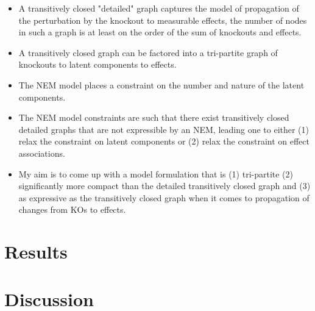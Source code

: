 \documentclass{article}
\begin{document}
\begin{itemize}
 \item A transitively closed "detailed" graph captures the model of propagation of the perturbation by the knockout to measurable effects, the number of nodes in such a graph is at least on the order of the sum of knockouts and effects.
 \item A transitively closed graph can be factored into a tri-partite graph of knockouts to latent components to effects.
 \item The NEM model places a constraint on the number and nature of the latent components.
 \item The NEM model constraints are such that there exist transitively closed detailed graphs that are not expressible by an NEM, leading one to either (1) relax the constraint on latent components or (2) relax the constraint on effect associations.
 \item My aim is to come up with a model formulation that is (1) tri-partite (2) significantly more compact than the detailed transitively closed graph and (3) as expressive as the transitively closed graph when it comes to propagation of changes from KOs to effects.
\end{itemize}

\section{Results}

\section{Discussion}

\printbibliography
\end{document}
